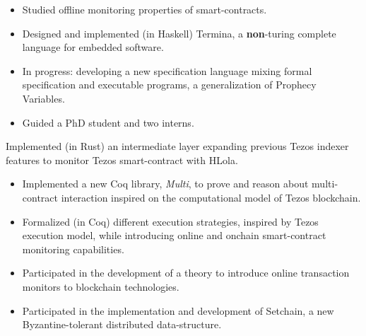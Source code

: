 
    \begin{itemize}
        \item Studied offline monitoring properties of smart-contracts.
        \item Designed and implemented (in Haskell) Termina, a
            \textbf{non}-turing complete language for embedded software.
        \item In progress: developing a new specification language mixing formal
            specification and executable programs, a generalization of Prophecy Variables.
        \item Guided a PhD student and two interns.
    \end{itemize}
    \divider

        Implemented (in Rust) an intermediate layer expanding previous
            Tezos indexer features to monitor Tezos smart-contract with HLola.

    \divider

    \begin{itemize}
        \item Implemented a new Coq library,
            \emph{Multi}, to prove and reason about multi-contract
            interaction inspired on the computational model of Tezos blockchain.
        \item Formalized (in Coq) different execution strategies, inspired by
            Tezos execution model, while introducing online and onchain smart-contract
            monitoring capabilities.
        \item Participated in the development of a theory to introduce
            online transaction monitors to blockchain
            technologies.
        \item Participated in the implementation and development of
            Setchain, a new Byzantine-tolerant distributed
            data-structure.
    \end{itemize}
    \divider

